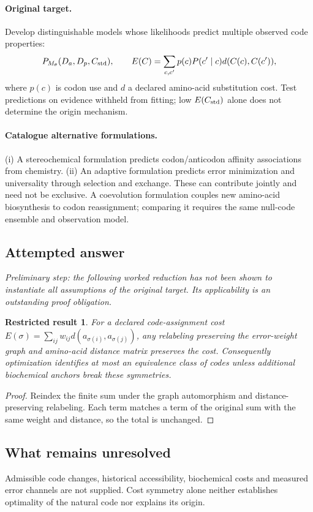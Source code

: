 \documentclass[11pt]{article}
\newtheorem{attemptresult}{Restricted result}[section]
\begin{document}
\paragraph{Original target.}
Develop distinguishable models whose likelihoods predict multiple observed code properties:
\[
P_{M_\theta}(D_a,D_p,C_{\rm std}),\qquad
E(C)=\sum_{c,c'}p(c)P(c'\mid c)d(C(c),C(c')),
\]
where $p(c)$ is codon use and $d$ a declared amino-acid substitution cost. Test predictions on evidence withheld from fitting; low $E(C_{\rm std})$ alone does not determine the origin mechanism.
\paragraph{Catalogue alternative formulations.}
(i) A stereochemical formulation predicts codon/anticodon affinity associations from chemistry. (ii) An adaptive formulation predicts error minimization and universality through selection and exchange. These can contribute jointly and need not be exclusive. A coevolution formulation couples new amino-acid biosynthesis to codon reassignment; comparing it requires the same null-code ensemble and observation model.
\subsection{Attempted answer}
\noindent\emph{Preliminary step: the following worked reduction has not been shown to instantiate all assumptions of the original target. Its applicability is an outstanding proof obligation.}

\begin{attemptresult}
For a declared code-assignment cost $E(\sigma)=\sum_{ij}w_{ij}d(a_{\sigma(i)},a_{\sigma(j)})$, any relabeling preserving the error-weight graph and amino-acid distance matrix preserves the cost. Consequently optimization identifies at most an equivalence class of codes unless additional biochemical anchors break these symmetries.
\end{attemptresult}
\begin{proof}
Reindex the finite sum under the graph automorphism and distance-preserving relabeling. Each term matches a term of the original sum with the same weight and distance, so the total is unchanged.
\end{proof}
\subsection{What remains unresolved}
Admissible code changes, historical accessibility, biochemical costs and measured error channels are not supplied. Cost symmetry alone neither establishes optimality of the natural code nor explains its origin.
\end{document}

